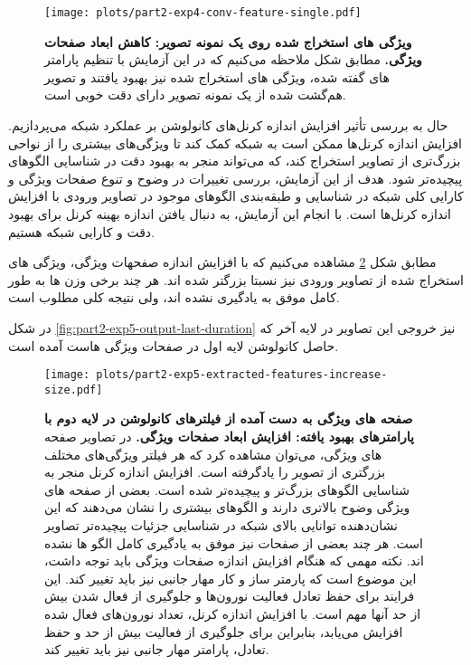                \begin{figure}[!ht]
                    \centering
                    \texttt{[image: plots/part2-exp4-conv-feature-single.pdf]} 
                    \captionsetup{width=.9\linewidth}
                    \caption{\textbf{ ویژگی های استخراج شده روی یک نمونه تصویر: کاهش ابعاد صفحات ویژگی. } مطابق شکل ملاحظه می‌کنیم که در این آزمایش با تنظیم پارامتر های گفته شده، ویژگی های استخراج شده نیز بهبود یافتند و تصویر هم‌گشت شده از یک نمونه تصویر دارای دقت خوبی است.
                    }
                    \label{fig:part2-exp4-conv-feature-single}
                \end{figure}

                حال به بررسی تأثیر افزایش اندازه کرنل‌های کانولوشن بر عملکرد شبکه
                می‌پردازیم. افزایش اندازه کرنل‌ها ممکن است به شبکه کمک کند تا ویژگی‌های بیشتری را از نواحی بزرگ‌تری از تصاویر استخراج کند، که می‌تواند منجر به بهبود دقت در شناسایی الگوهای پیچیده‌تر شود. هدف از این آزمایش، بررسی تغییرات در وضوح و تنوع صفحات ویژگی
                و کارایی کلی شبکه در شناسایی و طبقه‌بندی الگوهای موجود در تصاویر ورودی با افزایش اندازه کرنل‌ها است. با انجام این آزمایش، به دنبال یافتن اندازه بهینه کرنل برای بهبود دقت و کارایی شبکه هستیم.

                مطابق شکل 
                \ref{fig:part2-exp5-extracted-features-increase-size}
                مشاهده می‌کنیم که با افزایش اندازه صفحهات ویژگی، ویژگی های استخراج شده از تصاویر ورودی نیز نسبتا بزرگتر شده اند. هر چند برخی وزن ها به طور کامل موفق به یادگیری نشده اند، ولی نتیجه کلی مطلوب است.

                در شکل 
                \ref{fig:part2-exp5-output-last-duration}
                نیز خروجی این تصاویر در لایه آخر که حاصل کانولوشن لایه اول در صفحات ویژگی هاست آمده است.

                \begin{figure}[!ht]
                    \centering
                    \texttt{[image: plots/part2-exp5-extracted-features-increase-size.pdf]} 
                    \captionsetup{width=\linewidth}
                    \caption{\textbf{ صفحه های ویژگی به دست آمده از فیلترهای کانولوشن در لایه دوم با پارامترهای بهبود یافته: افزایش ابعاد صفحات ویژگی.}  در تصاویر صفحه های ویژگی، می‌توان مشاهده کرد که هر فیلتر ویژگی‌های مختلف بزرگتری از تصویر را یادگرفته است. افزایش اندازه کرنل منجر به شناسایی الگوهای بزرگ‌تر و پیچیده‌تر شده است. بعضی از صفحه های ویژگی وضوح بالاتری دارند و الگوهای بیشتری را نشان می‌دهند که این نشان‌دهنده توانایی بالای شبکه در شناسایی جزئیات پیچیده‌تر تصاویر است. هر چند بعضی از صفحات نیز موفق به یادگیری کامل الگو ها نشده اند. نکته مهمی که هنگام افزایش اندازه صفحات ویژگی باید توجه داشت، این موضوع است که پارمتر ساز و کار مهار جانبی نیز باید تغییر کند. 
                    این فرایند برای حفظ تعادل فعالیت نورون‌ها و جلوگیری از فعال شدن بیش از حد آنها مهم است. با افزایش اندازه کرنل، تعداد نورون‌های فعال شده افزایش می‌یابد، بنابراین برای جلوگیری از فعالیت بیش از حد و حفظ تعادل، پارامتر مهار جانبی نیز باید تغییر کند.
                    }
                    \label{fig:part2-exp5-extracted-features-increase-size}
                \end{figure}
                
